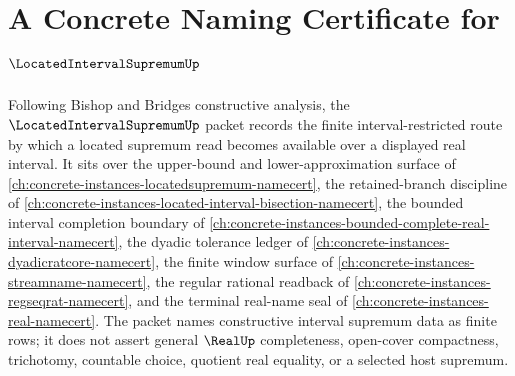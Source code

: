 \chapter{A Concrete Naming Certificate for $\LocatedIntervalSupremumUp$}
\label{ch:concrete-instances-located-interval-supremum-namecert}

Following Bishop and Bridges constructive analysis, the $\LocatedIntervalSupremumUp$ packet records the finite interval-restricted route by which a located supremum read becomes available over a displayed real interval. It sits over the upper-bound and lower-approximation surface of \autoref{ch:concrete-instances-locatedsupremum-namecert}, the retained-branch discipline of \autoref{ch:concrete-instances-located-interval-bisection-namecert}, the bounded interval completion boundary of \autoref{ch:concrete-instances-bounded-complete-real-interval-namecert}, the dyadic tolerance ledger of \autoref{ch:concrete-instances-dyadicratcore-namecert}, the finite window surface of \autoref{ch:concrete-instances-streamname-namecert}, the regular rational readback of \autoref{ch:concrete-instances-regseqrat-namecert}, and the terminal real-name seal of \autoref{ch:concrete-instances-real-namecert}. The packet names constructive interval supremum data as finite rows; it does not assert general $\RealUp$ completeness, open-cover compactness, trichotomy, countable choice, quotient real equality, or a selected host supremum.


